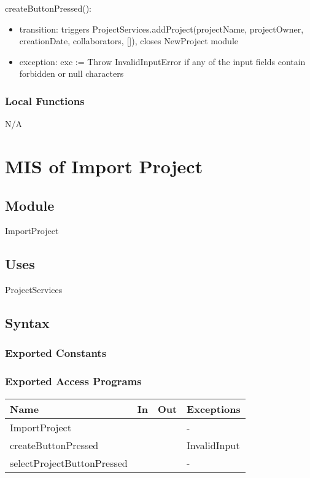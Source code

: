 \documentclass[12pt, titlepage]{article}
\begin{document}
	\noindent createButtonPressed():
	\begin{itemize}
		\item transition: triggers ProjectServices.addProject(projectName, projectOwner, creationDate, collaborators, []), closes NewProject module
		\item exception: exc := Throw InvalidInputError if any of the input fields contain forbidden or null characters
	\end{itemize}
	
	\subsubsection{Local Functions}
	
	N/A
	
	\newpage
	\section{MIS of Import Project} \label{Module} 
	
	\subsection{Module}
	
	ImportProject
	
	\subsection{Uses}
	ProjectServices
	
	\subsection{Syntax}
	
	\subsubsection{Exported Constants}
	
	\subsubsection{Exported Access Programs}
	
	\begin{center}
		\begin{tabular}{p{2cm} p{4cm} p{4cm} p{2cm}}
			\hline
			\textbf{Name} & \textbf{In} & \textbf{Out} & \textbf{Exceptions} \\
			\hline
			ImportProject &  &  & - \\
			\hline
			createButtonPressed &  &  & InvalidInput \\
			\hline
			selectProjectButtonPressed &  &  & - \\
			\hline
		\end{tabular}
	\end{center}
	
\end{document}
